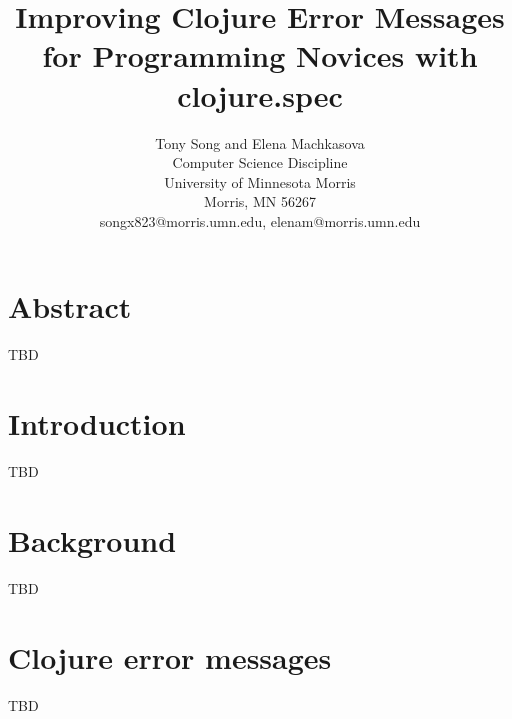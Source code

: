 \documentclass[12pt]{article}
\newcommand{\comment}[1]{}
\begin{document}
\pagestyle{plain}
%

\title{Improving Clojure Error Messages for Programming Novices with clojure.spec}
%
%

\author{
Tony Song and Elena Machkasova \\
Computer Science Discipline \\
University of Minnesota Morris\\
Morris, MN 56267\\
songx823@morris.umn.edu, elenam@morris.umn.edu
}
\date{}
\maketitle
\thispagestyle{empty}

\section*{\centering Abstract}
TBD

\newpage
\setcounter{page}{1}

\section*{\centering Introduction}
TBD

\section*{\centering Background}
TBD

\section*{\centering Clojure error messages}
TBD
\end{document}
